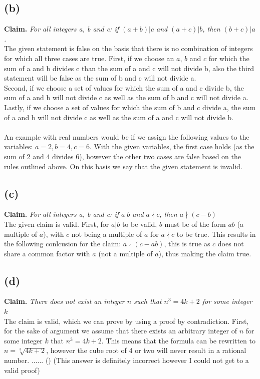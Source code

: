 \documentclass[a4paper]{article}
\begin{document}
\subsection{(b)}
\textbf{Claim.} \textit{For all integers a, b and c: if $(a + b) | c$ and $(a + c)|b$, then $(b + c) | a $.}\\
The given statement is false on the basis that there is no combination of integers for which all three cases are true.
First, if we choose an $a$, $b$ and $c$ for which the sum of a and b divides c than the sum of a and c will not divide b, also the third statement will be false as the sum of b and c will not divide a.\\
Second, if we choose a set of values for which the sum of a and c divide b, the sum of a and b will not divide c as well as the sum of b and c will not divide a.\\
Lastly, if we choose a set of values for which the sum of b and c divide a, the sum of a and b will not divide c as well as the sum of a and c will not divide b.\\
\\
An example with real numbers would be if we assign the following values to the variables: $a = 2, b = 4, c = 6$.
With the given variables, the first case holds (as the sum of 2 and 4 divides 6), however the other two cases are false based on the rules outlined above.
On this basis we say that the given statement is invalid.
\subsection{(c)}
\textbf{Claim.} \textit{For all integers a, b and c: if $a|b$ and $a \nmid c$, then $a \nmid (c-b)$} \\
The given claim is valid.
First, for $a | b$ to be valid, $b$ must be of the form $ab$ (a multiple of $a$), with $c$ not being a multiple of $a$ for $a \nmid c$ to be true.
This results in the following conlcusion for the claim: $a \nmid (c - ab)$, this is true as $c$ does not share a common factor with $a$ (not a multiple of $a$), thus making the claim true.

\subsection{(d)}
\textbf{Claim.} \textit{There does not exist an integer $n$ such that $n^3 = 4k + 2$ for some integer $k$} \\
The claim is valid, which we can prove by using a proof by contradiction.
First, for the sake of argument we assume that there exists an arbitrary integer of $n$ for some integer $k$ that $n^3 = 4k + 2$.
This means that the formula can be rewritten to $n = \sqrt[3]{4k +2}$, however the cube root of 4 or two will never result in a rational number.
...... ()
(This answer is definitely incorrect however I could not get to a valid proof)
\end{document}
